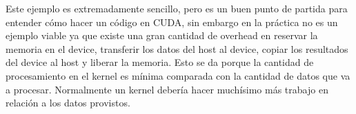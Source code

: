 Este ejemplo es extremadamente sencillo, pero es un buen punto de partida para entender cómo hacer un código en CUDA,
sin embargo en la práctica no es un ejemplo viable ya que existe una gran cantidad de overhead en reservar la memoria en
el device, transferir los datos del host al device, copiar los resultados del device al host y liberar la memoria. Esto
se da porque la cantidad de procesamiento en el kernel es mínima comparada con la cantidad de datos que va a procesar.
Normalmente un kernel debería hacer muchísimo más trabajo en relación a los datos provistos.




